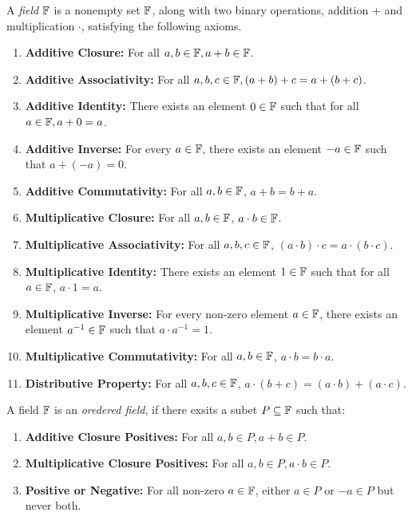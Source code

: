 \begin{definition}
  A \emph{field} $\mathbb{F}$ is a nonempty set $\mathbb{F}$, along with two binary operations, addition $+$ and multiplication $\cdot$, satisfying the following axioms.
  \begin{enumerate}
    \item \textbf{Additive Closure:} For all $a, b \in \mathbb{F}, a + b \in \mathbb{F}$.
    \item \textbf{Additive Associativity:} For all $a, b, c \in \mathbb{F}, (a + b) + c = a + (b + c)$.
    \item \textbf{Additive Identity:} There exists an element $0 \in \mathbb{F}$ such that for all $a \in \mathbb{F}, a + 0 = a$.
    \item \textbf{Additive Inverse:} For every $a \in \mathbb{F}$, there exists an element $-a \in \mathbb{F}$ such that $a + (-a) = 0$.
    \item \textbf{Additive Commutativity:} For all $a, b \in \mathbb{F}$, $a + b = b + a$.
    \item \textbf{Multiplicative Closure:} For all $a, b \in \mathbb{F}$, $a \cdot b \in \mathbb{F}$.
    \item \textbf{Multiplicative Associativity:} For all $a, b, c \in \mathbb{F}$, $(a \cdot b) \cdot c = a \cdot (b \cdot c)$.
    \item \textbf{Multiplicative Identity:} There exists an element $1 \in \mathbb{F}$ such that for all $a \in \mathbb{F}$, $a \cdot 1 = a$.
    \item \textbf{Multiplicative Inverse:} For every non-zero element $a \in \mathbb{F}$, there exists an element $a^{-1} \in \mathbb{F}$ such that $a \cdot a^{-1} = 1$.
    \item \textbf{Multiplicative Commutativity:} For all $a, b \in \mathbb{F}$, $a \cdot b = b \cdot a$.
    \item \textbf{Distributive Property:} For all $a, b, c \in \mathbb{F}$, $a \cdot (b + c) = (a \cdot b) + (a \cdot c)$.
  \end{enumerate}
\end{definition}

\begin{definition}
  A field $\mathbb{F}$ is an \emph{oredered field}, if there exsits a subet $P \subseteq \mathbb{F}$ such that:
  \begin{enumerate}
    \item \textbf{Additive Closure Positives:} For all $a, b \in P, a + b \in P$.
    \item \textbf{Multiplicative Closure Positives:} For all $a, b \in P, a \cdot b \in P$.
    \item \textbf{Positive or Negative:} For all non-zero $a \in \mathbb{F}$, either $a \in P$ or $-a \in P$ but never both.
  \end{enumerate}
\end{definition}



